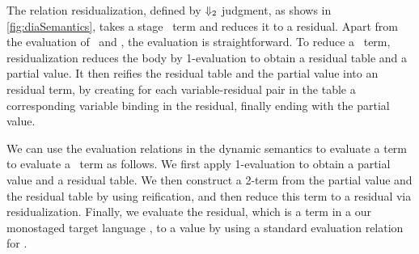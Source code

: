 The relation residualization, defined by ${\Downarrow_{ 2}}$ judgment, as shows
in \ref{fig:diaSemantics}, takes a stage \bbtwo\ term and reduces it to
a residual.  Apart from the evaluation of \prev\ and \pause, the
evaluation is straightforward. To reduce a \prev\ term, residualization
reduces the body by 1-evaluation to obtain a residual table and a
partial value.  It then reifies the residual table and the partial
value into an residual term, by creating for each variable-residual
pair in the table a corresponding variable binding in the residual,
finally ending with the partial value.

We can use the evaluation relations in the dynamic semantics to
evaluate a term to evaluate a \lang\ term as follows. We first apply
1-evaluation to obtain a partial value and a residual table. We then
construct a 2-term from the partial value and the residual table by
using reification, and then reduce this term to a residual via
residualization.  Finally, we evaluate the residual, which is a term in a
our monostaged target language \langmono, to a value by using  a
standard evaluation relation for \langmono.





